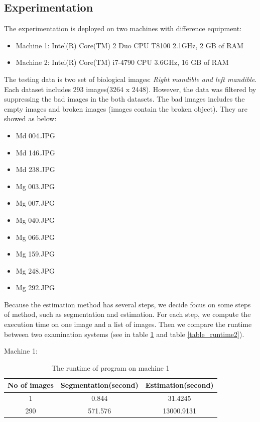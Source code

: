 \subsection{Experimentation}
The experimentation is deployed on two machines with difference equipment:
\begin{itemize}
\item Machine 1: Intel(R) Core(TM) 2 Duo CPU T8100 2.1GHz, 2 GB of RAM
\item Machine 2: Intel(R) Core(TM) i7-4790 CPU 3.6GHz, 16 GB of RAM
\end{itemize}
The testing data is two set of biological images: \textit{Right mandible and left mandible}. Each dataset includes 293 images(3264 x 2448). However, the data was filtered by suppressing the bad images in the both datasets. The bad images includes the empty images and broken images (images contain the broken object). They are showed as below:
\begin{multicols}{3}
\begin{itemize}
\item Md 004.JPG
\item Md 146.JPG
\item Md 238.JPG
\item Mg 003.JPG
\item Mg 007.JPG
\item Mg 040.JPG
\item Mg 066.JPG
\item Mg 159.JPG
\item Mg 248.JPG
\item Mg 292.JPG
\end{itemize} 
\end{multicols}
Because the estimation method has several steps, we decide focus on some steps of method, such as segmentation and estimation. For each step, we compute the execution time on one image and a list of images. Then we compare the runtime between two examination systems (see in table \ref{table_runtime1} and table \ref{table_runtime2}).

Machine 1:
\begin{table}[h]
	\centering
	\begin{tabular}{|c|c|c|}
		\hline
		No of images & Segmentation(second) & Estimation(second) \\ \hline
		1 & 0.844 & 31.4245   \\ \hline
		290 & 571.576 & 13000.9131   \\ \hline
	\end{tabular}	
	\caption{The runtime of program on machine 1}		
	\label{table_runtime1}
\end{table}

